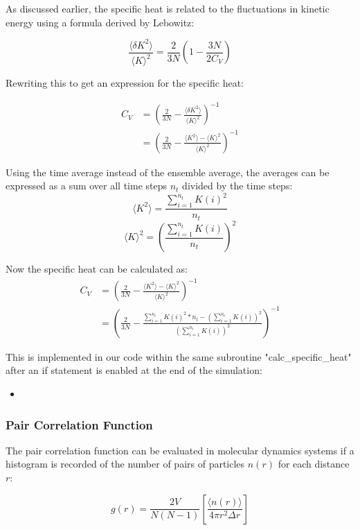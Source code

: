 \documentclass[
10pt, %
a4paper, %
oneside, %
headinclude,footinclude, %
BCOR5mm, %
]{scrartcl}
\newcommand{\insertcode}[2]{\begin{itemize}\item[]\end{itemize}} %
\begin{document}
\noindent
As discussed earlier, the specific heat is related to the fluctuations in kinetic energy using a formula derived by Lebowitz\cite{Duane:1985lz}:

$$ \frac{\langle\delta K^2\rangle}{\langle K\rangle^2} = \frac{2}{3N} \left ( 1 - \frac{3N}{2C_V} \right ) $$

\noindent
Rewriting this to get an expression for the specific heat:

\begin{align}
C_V &= \left (\frac{2}{3N} - \frac{\langle\delta K^2\rangle}{\langle K\rangle^2}\right)^{-1} \\
&= \left (\frac{2}{3N} - \frac{\langle K^2 \rangle - \langle K \rangle^2}{\langle K\rangle^2} \right )^{-1} 
\end{align}


\noindent
Using the time average instead of the ensemble average, the averages can be expressed as a sum over all time steps $n_t$ divided by the time steps:
$$ \langle K^2 \rangle  = \frac{\sum_{i=1}^{n_t} K(i)^2}{n_t} $$
$$ \langle K \rangle^2  = \left ( \frac{\sum_{i=1}^{n_t} K(i)  }{n_t} \right)^2 $$

\noindent
Now the specific heat can be calculated as:
\begin{align}
C_V &= \left (\frac{2}{3N} - \frac{\langle K^2 \rangle - \langle K \rangle^2}{\langle K\rangle^2} \right )^{-1} \\
&= \left ( \frac{2}{3N} - \frac{\sum_{i=1}^{n_t} K(i)^2*n_t - \left (\sum_{i=1}^{n_t} K(i) \right )^2 }{\left (\sum_{i=1}^{n_t} K(i) \right )^2 } \right )^{-1}
\end{align}

This is implemented in our code within the same subroutine "calc\_specific\_heat" after an if statement is enabled at the end of the simulation:
\insertcode{"Scripts/specific_heat_snippet_2.f90"}{Calculating the specific heat} %


\subsubsection{Pair Correlation Function}

The pair correlation function can be evaluated in molecular dynamics systems  if a histogram is recorded of the number of pairs of particles $n(r)$ for each distance $r$:

$$ g(r) = \frac{2V}{N(N-1)} \left [ \frac{\langle n(r) \rangle }{ 4 \pi r^2 \Delta r} \right ] $$
\end{document}
